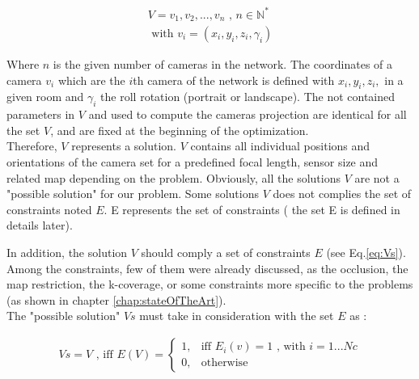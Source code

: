 \begin{equation}\label{eq:V}
		\begin{split}
			V= {v_1,v_2,...,v_n} \mbox{  , } n\in \mathbb{N}^*
				\\
			\mbox{ with } v_i= (x_i,y_i,z_i,\gamma_i)
		\end{split}
	\end{equation}
	
\noindent Where $n$ is the given number of cameras in the network. The coordinates of a camera $v_i$ which are the $i$th camera of the network is defined  with $x_i, y_i, z_i,$ in a given room and $\gamma_i$ the roll rotation (portrait or landscape). The not contained parameters in $V$ and used to compute the cameras projection are  identical for all the set $V$, and are fixed at the beginning of the optimization.\\
Therefore, $V$ represents a solution. $V$ contains all individual positions and orientations of the camera set for a predefined focal length, sensor size and related map depending on the problem.%
 Obviously, all the solutions $V$ are not a "possible solution" for our problem. Some solutions $V$ does not complies the set of constraints noted $E$. E represents the set of constraints ( the set E is defined  in details later). 

In addition, the solution $V$ should comply a set of constraints  $E$ (see Eq.\ref{eq:Vs}). Among the constraints, few of them were already discussed, as the occlusion, the map restriction, the k-coverage, or some constraints more specific to the problems (as shown in chapter \ref{chap:stateOfTheArt}).\\
 The "possible solution" $Vs$ must take in consideration with the set $E$ as :

 \begin{align}\label{eq:Vs}
Vs=V \mbox{ , iff } E(V)= \begin{cases} 1, & \mbox{iff } E_i(v)=1 \mbox{ , with } i=1...Nc \\ 0, & \mbox{otherwise}  \end{cases}
\end{align}

